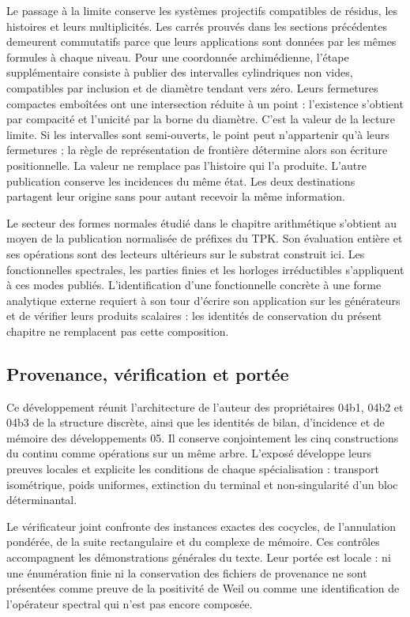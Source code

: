 Le passage à la limite conserve les systèmes projectifs compatibles de résidus, les histoires et leurs multiplicités. Les carrés prouvés dans les sections précédentes demeurent commutatifs parce que leurs applications sont données par les mêmes formules à chaque niveau. Pour une coordonnée archimédienne, l'étape supplémentaire consiste à publier des intervalles cylindriques non vides, compatibles par inclusion et de diamètre tendant vers zéro. Leurs fermetures compactes emboîtées ont une intersection réduite à un point : l'existence s'obtient par compacité et l'unicité par la borne du diamètre. C'est la valeur de la lecture limite. Si les intervalles sont semi-ouverts, le point peut n'appartenir qu'à leurs fermetures ; la règle de représentation de frontière détermine alors son écriture positionnelle. La valeur ne remplace pas l'histoire qui l'a produite. L'autre publication conserve les incidences du même état. Les deux destinations partagent leur origine sans pour autant recevoir la même information.

Le secteur des formes normales étudié dans le chapitre arithmétique s’obtient au moyen de la publication normalisée de préfixes du TPK. Son évaluation entière et ses opérations sont des lecteurs ultérieurs sur le substrat construit ici. Les fonctionnelles spectrales, les parties finies et les horloges irréductibles s’appliquent à ces modes publiés. L’identification d’une fonctionnelle concrète à une forme analytique externe requiert à son tour d’écrire son application sur les générateurs et de vérifier leurs produits scalaires : les identités de conservation du présent chapitre ne remplacent pas cette composition.

\clearpage
\subsection{Provenance, vérification et portée}
Ce développement réunit l’architecture de l’auteur des propriétaires 04b1, 04b2 et 04b3 de la structure discrète, ainsi que les identités de bilan, d’incidence et de mémoire des développements 05. Il conserve conjointement les cinq constructions du continu comme opérations sur un même arbre. L’exposé développe leurs preuves locales et explicite les conditions de chaque spécialisation : transport isométrique, poids uniformes, extinction du terminal et non-singularité d’un bloc déterminantal.

Le vérificateur joint confronte des instances exactes des cocycles, de l’annulation pondérée, de la suite rectangulaire et du complexe de mémoire. Ces contrôles accompagnent les démonstrations générales du texte. Leur portée est locale : ni une énumération finie ni la conservation des fichiers de provenance ne sont présentées comme preuve de la positivité de Weil ou comme une identification de l’opérateur spectral qui n’est pas encore composée.
